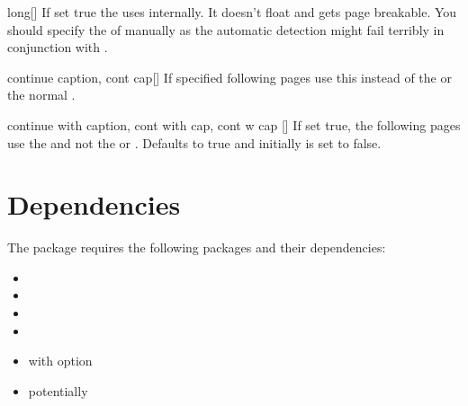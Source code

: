\begin{describeopt}{long}[]
  If set true the  uses  internally. It doesn't
  float and gets page breakable. You should specify the  of
   manually as the automatic detection might fail terribly in
  conjunction with .
\end{describeopt}
\begin{describeopt}{continue caption, cont cap}[]
  If specified following pages use this  instead of the  or the normal .
\end{describeopt}
\begin{describeopt}{continue with caption, cont with cap, cont w cap}%
  []
  If set true, the following pages use the  and not the  or . Defaults to true and initially is set to
  false.
\end{describeopt}%

\section{Dependencies}%
The package requires the following packages and their dependencies:
\vspace*{-\multicolsep}%
\begin{multicols}{3}
  \begin{itemize}
    \item {}
    \item {}
    \item {}
    \item {}
    \item {} with option 
    \item potentially 
  \end{itemize}
\end{multicols}
\vspace*{-\multicolsep}%
